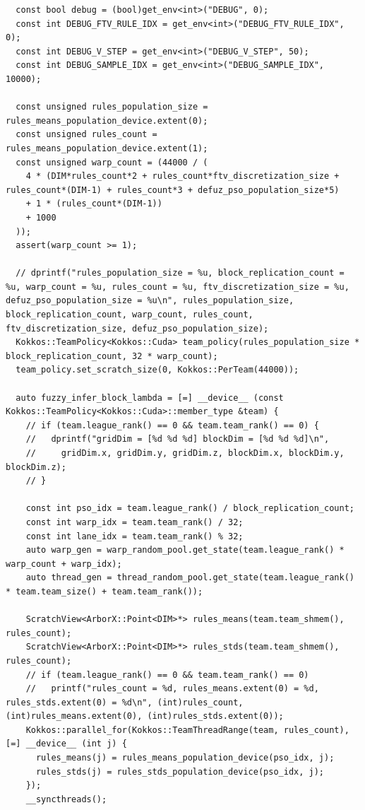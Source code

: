 \begin{verbatim}
  const bool debug = (bool)get_env<int>("DEBUG", 0);
  const int DEBUG_FTV_RULE_IDX = get_env<int>("DEBUG_FTV_RULE_IDX", 0);
  const int DEBUG_V_STEP = get_env<int>("DEBUG_V_STEP", 50);
  const int DEBUG_SAMPLE_IDX = get_env<int>("DEBUG_SAMPLE_IDX", 10000);

  const unsigned rules_population_size = rules_means_population_device.extent(0);
  const unsigned rules_count = rules_means_population_device.extent(1);
  const unsigned warp_count = (44000 / (
    4 * (DIM*rules_count*2 + rules_count*ftv_discretization_size + rules_count*(DIM-1) + rules_count*3 + defuz_pso_population_size*5)
    + 1 * (rules_count*(DIM-1))
    + 1000
  ));
  assert(warp_count >= 1);

  // dprintf("rules_population_size = %u, block_replication_count = %u, warp_count = %u, rules_count = %u, ftv_discretization_size = %u, defuz_pso_population_size = %u\n", rules_population_size, block_replication_count, warp_count, rules_count, ftv_discretization_size, defuz_pso_population_size);
  Kokkos::TeamPolicy<Kokkos::Cuda> team_policy(rules_population_size * block_replication_count, 32 * warp_count);
  team_policy.set_scratch_size(0, Kokkos::PerTeam(44000));

  auto fuzzy_infer_block_lambda = [=] __device__ (const Kokkos::TeamPolicy<Kokkos::Cuda>::member_type &team) {
    // if (team.league_rank() == 0 && team.team_rank() == 0) {
    //   dprintf("gridDim = [%d %d %d] blockDim = [%d %d %d]\n",
    //     gridDim.x, gridDim.y, gridDim.z, blockDim.x, blockDim.y, blockDim.z);
    // }

    const int pso_idx = team.league_rank() / block_replication_count;
    const int warp_idx = team.team_rank() / 32;
    const int lane_idx = team.team_rank() % 32;
    auto warp_gen = warp_random_pool.get_state(team.league_rank() * warp_count + warp_idx);
    auto thread_gen = thread_random_pool.get_state(team.league_rank() * team.team_size() + team.team_rank());

    ScratchView<ArborX::Point<DIM>*> rules_means(team.team_shmem(), rules_count);
    ScratchView<ArborX::Point<DIM>*> rules_stds(team.team_shmem(), rules_count);
    // if (team.league_rank() == 0 && team.team_rank() == 0)
    //   printf("rules_count = %d, rules_means.extent(0) = %d, rules_stds.extent(0) = %d\n", (int)rules_count, (int)rules_means.extent(0), (int)rules_stds.extent(0));
    Kokkos::parallel_for(Kokkos::TeamThreadRange(team, rules_count), [=] __device__ (int j) {
      rules_means(j) = rules_means_population_device(pso_idx, j);
      rules_stds(j) = rules_stds_population_device(pso_idx, j);
    });
    __syncthreads();


\end{verbatim}
